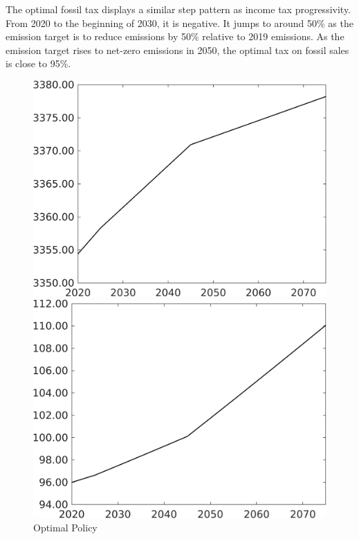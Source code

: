 The optimal fossil tax displays a similar step pattern as income tax progressivity. From 2020 to the beginning of 2030, it is negative. It jumps to around 50\% as the emission target is to reduce emissions by 50\% relative to 2019 emissions. As the emission target rises  to net-zero emissions in 2050, the optimal tax on fossil sales is close to 95\%. 

\begin{figure}[h!!]
	\centering
	\caption{Optimal Policy }\label{fig:optAll}
	\begin{minipage}[]{0.32\textwidth}
		\includegraphics[width=1\textwidth]{../../codding_model/own_basedOnFried/optimalPol_elastS_DisuSci/figures/all_1705/Single_OPT_T_NoTaus_Af_spillover0_sep1_BN0_ineq0_etaa0.79.png}
	\end{minipage}
	\begin{minipage}[]{0.32\textwidth}
		\includegraphics[width=1\textwidth]{../../codding_model/own_basedOnFried/optimalPol_elastS_DisuSci/figures/all_1705/Single_OPT_T_NoTaus_Ag_spillover0_sep1_BN0_ineq0_etaa0.79.png}

\end{minipage}
\end{figure}
